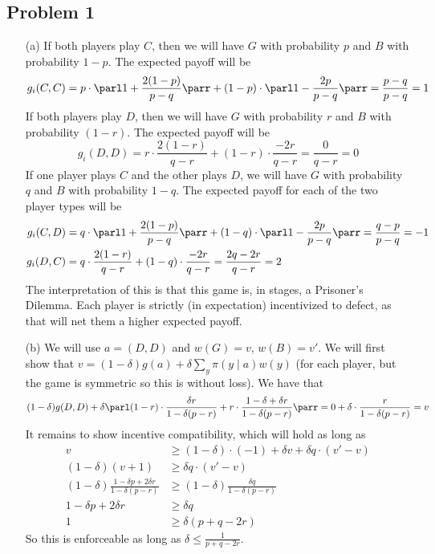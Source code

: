 \documentclass[10pt]{article}
\begin{document}
\maketitle

\subsection*{Problem 1}

\begin{itemize}
	\item[(a)] If both players play $C$, then we will have $G$ with probability $p$ and $B$ with probability $1-p$. The expected payoff will be
	\[
	g_i(C,C) = p \cdot \parl 1 + \frac{2(1-p)}{p-q}\parr + (1-p) \cdot \parl 1 - \frac{2p}{p-q}\parr = \frac{p-q}{p-q} = 1
	\]
	If both players play $D$, then we will have $G$ with probability $r$ and $B$ with probability $(1-r)$. The expected payoff will be
	\[
	g_i(D,D) = r \cdot \frac{2(1-r)}{q-r} + (1-r) \cdot \frac{-2r}{q-r} = \frac{0}{q-r} = 0\]
	If one player plays $C$ and the other plays $D$, we will have $G$ with probability $q$ and $B$ with probability $1-q$. The expected payoff for each of the two player types will be 
	\begin{align*}
		g_i(C,D) &= q\cdot \parl  1 + \frac{2(1-p)}{p-q}\parr + (1-q) \cdot \parl 1 - \frac{2p}{p-q}\parr = \frac{q-p}{p-q} =-1 \\
		g_i(D,C) &= q \cdot \frac{2(1-r)}{q-r} + (1-q) \cdot \frac{-2r}{q-r} = \frac{2q-2r}{q-r} = 2
	\end{align*}
	The interpretation of this is that this game is, in stages, a Prisoner's Dilemma. Each player is strictly (in expectation) incentivized to defect, as that will net them a higher expected payoff.
	\item[(b)] We will use $a = (D,D)$ and $w(G) = v$, $w(B) = v'$. We will first show that $v = (1-\delta) g(a) + \delta \sum_y \pi(y \mid a) w(y)$ (for each player, but the game is symmetric so this is without loss). We have that \[(1-\delta)g(D,D) + \delta \parl (1-r) \cdot \frac{\delta r}{1 - \delta(p-r)} + r \cdot \frac{1-\delta + \delta r}{1-\delta(p-r)}\parr = 0 + \delta \cdot \frac{r}{1-\delta(p-r)} = v\]It remains to show incentive compatibility, which will hold as long as \begin{align*} v &\ge (1-\delta) \cdot(-1) + \delta v + \delta q \cdot (v'-v) \\ (1-\delta)(v+1) &\ge \delta q \cdot (v'-v)\\(1-\delta) \frac{1 - \delta p + 2\delta r}{1-\delta(p-r)} &\ge (1-\delta) \frac{\delta q}{1-\delta(p-r)} \\1 - \delta p + 2\delta r &\ge \delta q \\1 &\ge \delta(p + q - 2r) \end{align*} So this is enforceable as long as $\delta \le \frac{1}{p+q-2r}$.

\end{itemize}
\end{document}
